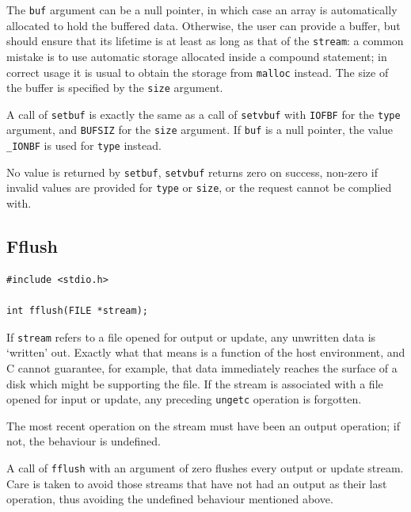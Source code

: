    The \texttt{buf} argument can be a null pointer,  in  which  case  an
    array  is automatically allocated to hold the buffered data.  Otherwise,
    the user can provide a buffer, but should  ensure that its lifetime is at
    least as long as that of the \texttt{stream}: a common mistake  is  to
    use  automatic  storage  allocated inside a compound statement; in correct
    usage it is usual to obtain the storage from \texttt{malloc} instead.
    The  size  of  the buffer is specified by the \texttt{size}
    argument.


   A call of \texttt{setbuf} is exactly the same as a  call  of
    \texttt{setvbuf} with   \texttt{IOFBF}  for the \texttt{type}
    argument, and \texttt{BUFSIZ} for the \texttt{size} argument.  If
    \texttt{buf} is a null pointer,  the  value  \texttt{\_IONBF}  is
    used for \texttt{type} instead.


   No value is returned by  \texttt{setbuf},  \texttt{setvbuf}
    returns  zero  on success, non-zero if invalid values are provided for
    \texttt{type} or \texttt{size}, or the request cannot be complied
    with.


  

  \subsection{Fflush}
   

   \begin{Verbatim}
#include <stdio.h>

int fflush(FILE *stream);
\end{Verbatim}

   If \texttt{stream} refers to a file opened for output or update,  any
    unwritten data is `written' out.  Exactly what that means is
    a function of the host environment, and C cannot  guarantee, for  example,
    that data immediately reaches the surface of a disk which might be
    supporting the file.  If the  stream  is associated  with  a  file  opened
    for  input or update, any preceding \texttt{ungetc} operation is
    forgotten.


   The most recent operation on the stream must  have  been  an output
    operation; if not, the behaviour is undefined.


   A call of \texttt{fflush} with an  argument  of  zero  flushes  every
    output  or  update  stream.   Care  is  taken to avoid those streams that
    have not had an output as their last operation, thus avoiding the undefined
    behaviour mentioned above.


